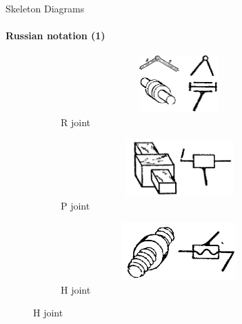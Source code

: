 \documentclass[aspectratio=169]{beamer}
\begin{document}
\begin{frame}[t]{Skeleton Diagrams}
    \framesubtitle{Russian notation (1)}
    \vspace{-0.5cm}
    \begin{figure}[H]
        \begin{subfigure}{0.32\textwidth}
            \centering\includegraphics[height=2.2cm,width=1\textwidth,keepaspectratio]{R_sd.png}
            \caption*{R joint}
        \end{subfigure}
        \begin{subfigure}{0.32\textwidth}
            \centering\includegraphics[height=2.2cm,width=1\textwidth,keepaspectratio]{P_sd.png}
            \caption*{P joint}
        \end{subfigure}
        \begin{subfigure}{0.32\textwidth}
            \centering\includegraphics[height=2.2cm,width=1\textwidth,keepaspectratio]{H_sd.png}
            \caption*{H joint}
        \end{subfigure}
    

\end{figure}
\end{frame}
\end{document}
